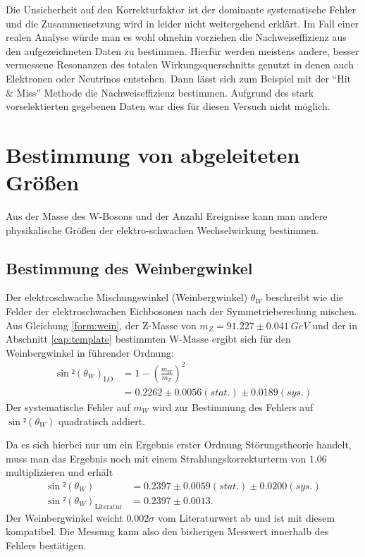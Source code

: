 \documentclass[a4paper,12pt]{article}
\begin{document}
Die Unsicherheit auf den Korrekturfaktor ist der dominante systematische Fehler und die Zusammensetzung wird in \cite{versuchsanleitung} leider nicht weitergehend erklärt. Im Fall einer realen Analyse würde man es wohl ohnehin vorziehen die Nachweiseffizienz aus
den aufgezeichneten Daten zu bestimmen. Hierfür werden meistens andere, besser vermessene Resonanzen des totalen Wirkungsquerschnitts genutzt
in denen auch Elektronen oder Neutrinos entstehen. Dann lässt sich zum Beispiel mit der "`Hit \&
Miss"' Methode die Nachweiseffizienz bestimmen. Aufgrund
des stark vorselektierten gegebenen Daten war dies für diesen Versuch nicht möglich.

\newpage
\section{Bestimmung von abgeleiteten Größen}
Aus der Masse des W-Bosons und der Anzahl Ereignisse kann man andere physikalische Größen
der elektro-schwachen Wechselwirkung bestimmen.
\subsection{Bestimmung des Weinbergwinkel}
Der elektroschwache Mischungswinkel (Weinbergwinkel) $\theta_{W}$ beschreibt wie die Felder der elektroschwachen Eichbosonen nach der Symmetrieberechung mischen.
Aus Gleichung \ref{form:wein}, der Z-Masse von $m_{Z}=91.227 \pm \SI{0.041}{GeV}$\cite{versuchsanleitung}
und der in Abschnitt \ref{cap:template} bestimmten W-Masse ergibt sich für den Weinbergwinkel in
führender Ordnung:
\begin{align*}
	\sin²\left(\theta_{W}\right)_\text{LO} &= 1 - \left(\frac{m_{W}}{m_{Z}}\right)^{2} \\
	&=  0.2262 ± 0.0056 (stat.) ± 0.0189(sys.)
\end{align*}
Der systematische Fehler auf $m_{W}$ wird zur Bestimmung des Fehlers auf $\sin²(\theta_{W})$ quadratisch addiert.

Da es sich hierbei nur um ein Ergebnis erster Ordnung Störungstheorie handelt, muss man das Ergebnis
noch mit einem Strahlungskorrekturterm von $1.06$ multiplizieren\cite{versuchsanleitung} und erhält
\begin{align*}
	\sin²(\theta_{W}) &=  0.2397 ± 0.0059 (stat.) ± 0.0200(sys.) \\
	\sin²(\theta_{W})_\text{Literatur} &= 0.2397 \pm 0.0013.
\end{align*}
Der Weinbergwinkel weicht $0.002\sigma$ vom Literaturwert ab und ist mit diesem
 kompatibel. Die Messung kann also den bisherigen Messwert innerhalb des Fehlers bestätigen.
\end{document}
